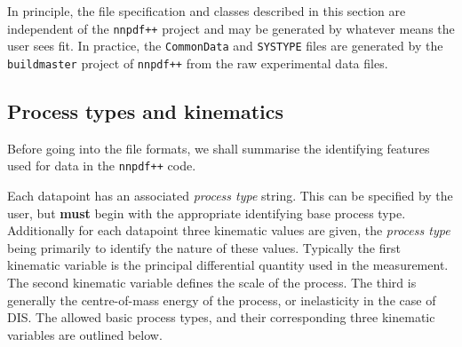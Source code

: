 \documentclass[11pt]{article}
\begin{document}
In principle, the file specification and classes described in this section are independent of the {\tt nnpdf++} project and may be generated by whatever means the user sees fit.
In practice, the {\tt CommonData} and {\tt SYSTYPE} files are generated by the {\tt buildmaster} project of {\tt nnpdf++} from the raw experimental data files.

\subsection{Process types and kinematics}
Before going into the file formats, we shall summarise the identifying features used for data in the {\tt nnpdf++} code. 

Each datapoint has an associated \emph{process type} string. This can be specified by the user, but \textbf{must} begin with the appropriate identifying base process type. Additionally for each datapoint three kinematic values are given, the \emph{process type} being primarily to identify the nature of these values. Typically the first kinematic variable is the principal differential quantity used in the measurement. The second kinematic variable defines the scale of the process. The third is generally the centre-of-mass energy of the process, or inelasticity in the case of DIS. The allowed basic process types, and their corresponding three kinematic variables are outlined below.
\end{document}
